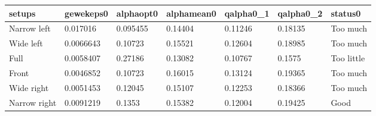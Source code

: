 \begin{tabular}{lllllll}
setups & gewekeps0 & alphaopt0 & alphamean0 & qalpha0_1 & qalpha0_2 & status0 \\ 
\hline 
Narrow left & 0.017016 & 0.095455 & 0.14404 & 0.11246 & 0.18135 & Too much \\ \hline 
Wide left & 0.0066643 & 0.10723 & 0.15521 & 0.12604 & 0.18985 & Too much \\ \hline 
Full & 0.0058407 & 0.27186 & 0.13082 & 0.10767 & 0.1575 & Too little \\ \hline 
Front & 0.0046852 & 0.10723 & 0.16015 & 0.13124 & 0.19365 & Too much \\ \hline 
Wide right & 0.0051453 & 0.12045 & 0.15107 & 0.12253 & 0.18366 & Too much \\ \hline 
Narrow right & 0.0091219 & 0.1353 & 0.15382 & 0.12004 & 0.19425 & Good \\ \hline 
\hline 
\end{tabular}